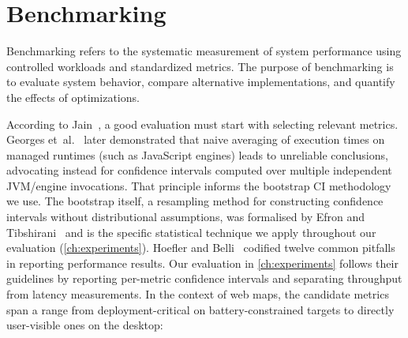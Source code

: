 \section{Benchmarking}\label{sec:benchmarking}

Benchmarking refers to the systematic measurement of system performance using controlled workloads and standardized metrics.
The purpose of benchmarking is to evaluate system behavior, compare alternative implementations, and quantify the effects of optimizations.

According to Jain~\cite{jainArtComputerSystems1991}, a good evaluation must start with selecting relevant metrics.
Georges et~al.~\cite{georgesStatisticallyRigorousJava2007} later demonstrated that naive averaging of execution times on managed runtimes (such as JavaScript engines) leads to unreliable conclusions, advocating instead for confidence intervals computed over multiple independent \ac{JVM}/engine invocations.
That principle informs the bootstrap CI methodology we use.
The bootstrap itself, a resampling method for constructing confidence intervals without distributional assumptions, was formalised by Efron and Tibshirani~\cite{efronIntroductionBootstrap1998} and is the specific statistical technique we apply throughout our evaluation (\cref{ch:experiments}).
Hoefler and Belli~\cite{hoeflerScientificBenchmarkingParallel2015} codified twelve common pitfalls in reporting performance results.
Our evaluation in \cref{ch:experiments} follows their guidelines by reporting per-metric confidence intervals and separating throughput from latency measurements.
In the context of web maps, the candidate metrics span a range from deployment-critical on battery-constrained targets to directly user-visible ones on the desktop:

